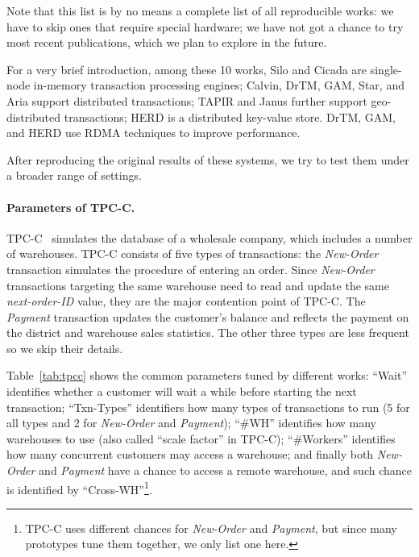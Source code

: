 Note that this list is by no means a complete list of all reproducible works: we have to skip ones that
require special hardware; we have not got a chance to try most
recent publications, which we plan to explore in the future.

For a very brief introduction, among these 10 works, Silo and Cicada are single-node in-memory
transaction processing engines; Calvin, DrTM, GAM, Star, and Aria support distributed transactions;
TAPIR and Janus further support geo-distributed transactions; HERD is a distributed
key-value store. DrTM, GAM, and HERD use RDMA techniques to improve performance.





After reproducing the original results of these systems, we try to test them under a broader range of settings.

\vspace{-.1in}
\paragraph{Parameters of TPC-C.}
TPC-C~\cite{tpccurl} simulates the database
of a wholesale company, which includes a number of warehouses.
TPC-C consists of five types of transactions: the \emph{New-Order} transaction simulates
the procedure of entering an order. Since \emph{New-Order} transactions targeting the same warehouse
need to read and update the same \emph{next-order-ID}
value, they are the major contention point of TPC-C. The \emph{Payment} transaction 
updates the customer's balance and reflects the payment on the district and warehouse sales statistics.
The other three types are less frequent so we skip their details.

Table~\ref{tab:tpcc} shows the common parameters tuned by different works: ``Wait'' identifies
whether a customer will wait a while before starting the next transaction; ``Txn-Types'' identifiers
how many types of transactions to run (5 for all types and 2 for \emph{New-Order} and \emph{Payment});
``\#WH'' identifies how many warehouses to use (also called ``scale factor'' in TPC-C);
``\#Workers'' identifies how many concurrent customers may access a warehouse; and finally both
\emph{New-Order} and \emph{Payment} have a chance to access a remote warehouse, and such chance
is identified by ``Cross-WH''\footnote{TPC-C uses different chances for \emph{New-Order} and \emph{Payment},
but since many prototypes tune them together, we only list one here.}.

